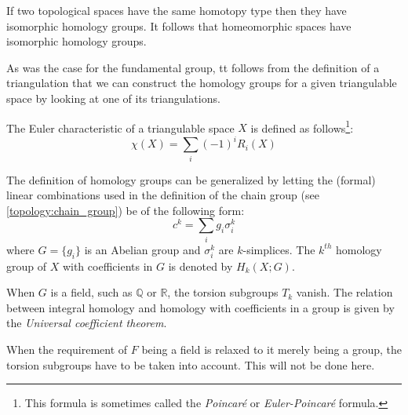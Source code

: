 	\begin{property}
		If two topological spaces have the same homotopy type then they have isomorphic homology groups. It follows that homeomorphic spaces have isomorphic homology groups.
	\end{property}
	\begin{result}
		As was the case for the fundamental group, tt follows from the definition of a triangulation that we can construct the homology groups for a given triangulable space by looking at one of its triangulations.
	\end{result}
	
	\begin{formula}
		The Euler characteristic of a triangulable space $X$ is defined as follows\footnote{This formula is sometimes called the \textit{Poincar\'e} or \textit{Euler-Poincar\'e} formula.}:
		\begin{equation}
			\boxed{\chi(X) = \sum_i(-1)^iR_i(X)}
		\end{equation}
	\end{formula}
	
	\begin{construct}
		The definition of homology groups can be generalized by letting the (formal) linear combinations used in the definition of the chain group (see \ref{topology:chain_group}) be of the following form:
		\begin{equation}
			c^k = \sum_ig_i\sigma_i^k
		\end{equation}
		where $G = \{g_i\}$ is an Abelian group and $\sigma_i^k$ are $k$-simplices. The $k^{th}$ homology group of $X$ with coefficients in $G$ is denoted by $H_k(X; G)$.
	\end{construct}
	\begin{property}
		When $G$ is a field, such as $\mathbb{Q}$ or $\mathbb{R}$, the torsion subgroups $T_k$ vanish. The relation between integral homology and homology with coefficients in a group is given by the \textit{Universal coefficient theorem}.
	\end{property}
	
	\begin{remark*}
		When the requirement of $F$ being a field is relaxed to it merely being a group, the torsion subgroups have to be taken into account. This will not be done here.
	\end{remark*}
	
